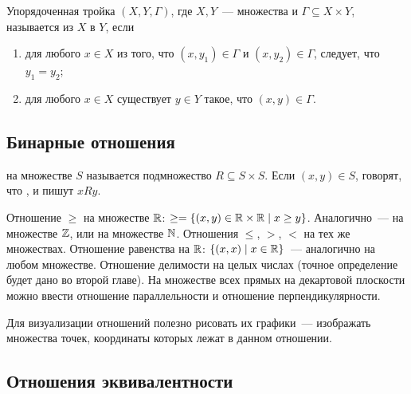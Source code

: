 \begin{definition}
Упорядоченная тройка $(X,Y,\Gamma)$, где $X,Y$~--- множества и
$\Gamma\subseteq X\times Y$, называется
 из $X$ в
$Y$, если
\begin{enumerate}
\item для любого $x\in X$ из того, что $(x,y_1)\in\Gamma$ и
$(x,y_2)\in\Gamma$, следует, что $y_1=y_2$;
\item для любого $x\in X$ существует $y\in Y$ такое, что
  $(x,y)\in\Gamma$.
\end{enumerate}
\end{definition}

\subsection{Бинарные отношения}


\begin{definition}
 на множестве $S$
называется подмножество
$R\subseteq S\times S$. Если $(x,y)\in S$, говорят, что
, и пишут
$xRy$.
\end{definition}


\begin{examples}\label{examples:relations}
Отношение $\geq$ на множестве $\mathbb R$: $\geq=\{(x,y)\in\mathbb R\times\mathbb
R\mid x\geq y\}$. Аналогично~--- на множестве $\mathbb Z$, или
на множестве $\mathbb N$. Отношения $\leq$, $>$, $<$ на тех же
множествах. Отношение равенства на $\mathbb R$: $\{(x,x)\mid x\in\mathbb
R\}$~--- аналогично на любом множестве.
Отношение делимости на целых числах (точное определение будет
дано во второй главе).
На множестве всех прямых на декартовой плоскости можно ввести
отношение параллельности и отношение перпендикулярности.
\end{examples}

Для визуализации отношений полезно рисовать их графики~---
изображать множества точек, координаты которых лежат в данном
отношении.

\subsection{Отношения эквивалентности}


